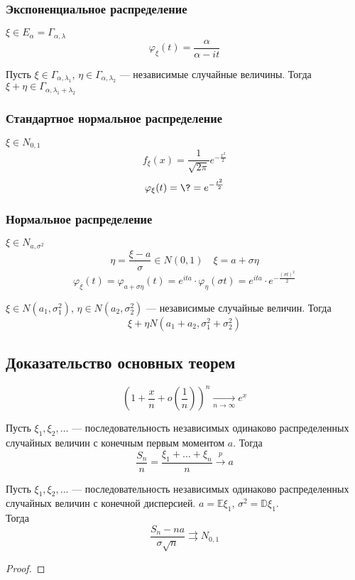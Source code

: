 \subsubsection{Экспоненциальное распределение}
\(\xi \in E_\alpha = \Gamma_{\alpha, \lambda}\)
\[ \varphi_\xi(t) = \frac{\alpha}{\alpha - it} \]
\begin{corollary}
    Пусть \(\xi \in \Gamma_{\alpha, \lambda_1}\), \(\eta \in \Gamma_{\alpha, \lambda_2}\) --- независимые случайные величины. Тогда \(\xi + \eta \in \Gamma_{\alpha, \lambda_1 + \lambda_2}\)
\end{corollary}

\subsubsection{Стандартное нормальное распределение}
\(\xi \in N_{0,1}\)
\[ f_\xi(x) = \frac{1}{\sqrt{2\pi}}e^{-\frac{x^2}{2}} \]
\[ \varphi_\xi(t) = \? = e^{-\frac{t^2}{2}} \]

\subsubsection{Нормальное распределение}
\(\xi \in N_{a,\sigma^2}\)
\[ \eta = \frac{\xi - a}{\sigma} \in N(0, 1)\quad \xi = a + \sigma\eta \]
\[ \varphi_\xi(t) = \varphi_{a + \sigma\eta}(t) = e^{ita}\cdot \varphi_\eta(\sigma t) = e^{ita}\cdot e^{-\frac{(\sigma t)^2}{2}} \]
\begin{corollary}
    \(\xi \in N(a_1, \sigma_1^2)\), \(\eta \in N(a_2, \sigma_2^2)\) --- независимые случайные величин. Тогда
    \[ \xi + \eta N(a_1 + a_2, \sigma_1^2 + \sigma_2^2) \]
\end{corollary}

\subsection{Доказательство основных теорем}
\begin{lemma}
    \[ \left(1 + \frac{x}{n} + o\left(\frac{1}{n}\right)\right)^n \xrightarrow[n \to \infty]{} e^x \]
\end{lemma}
\begin{theorem}
    Пусть \(\xi_1, \xi_2, \dots\) --- последовательность независимых одинаково распределенных случайных величин с конечным первым моментом \(a\).
    Тогда
    \[ \frac{S_n}{n} = \frac{\xi_1 + \dots + \xi_n}{n} \xrightarrow{p} a \]
\end{theorem}
\begin{theorem}
    Пусть \(\xi_1, \xi_2, \dots\) --- последовательность независимых одинаково распределенных случайных величин с конечной дисперсией. \(a = \mathbb{E}\xi_1\), \(\sigma^2 = \mathbb{D}\xi_1\). \\
    Тогда
    \[ \frac{S_n - na}{\sigma\sqrt{n}} \rightrightarrows N_{0, 1} \]
\end{theorem}
\begin{proof}
    \unfinished
\end{proof}

